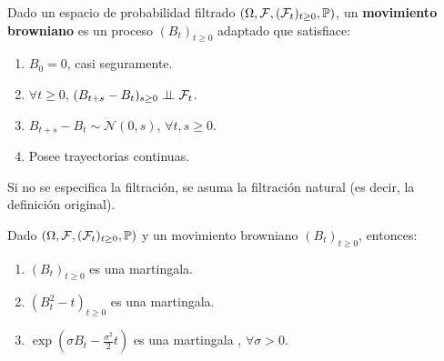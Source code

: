 \begin{definition}
Dado un espacio de probabilidad filtrado $(\Omega, \mathcal{F}, (\mathcal{F}_t)_{t \geq 0}, \P)$, 
un \textbf{movimiento browniano} es un proceso $(B_t)_{t\geq 0}$ adaptado que satisfiace:

\renewcommand{\labelenumi}{\roman{enumi})}
\begin{enumerate}
        \item   $B_0 = 0$, casi seguramente. 
        \item $\forall t \geq 0$, $(B_{t+s} - B_t)_{s \geq 0} \indep \mathcal{F}_t$. 
        \item $B_{t+s} - B_t \sim  \mathcal{N}(0,s)$, $\forall t,s \geq 0$. 
        \item Posee trayectorias continuas. 
\end{enumerate}
\end{definition}

Si no se especifica la filtración, se asuma la filtración natural (es decir, la definición original). 

\begin{proposition}
Dado $(\Omega, \mathcal{F},(\mathcal{F}_{t})_{t \geq 0}, \P)$ y un movimiento browniano 
$(B_{t})_{t \geq 0}$, entonces:

\begin{enumerate}
        \item \label{mba:1} $ (B_t)_{t \geq 0}$ es una martingala.
        \item \label{mba:2} $\left( B_t^2 - t \right)_{t \geq 0} $ es una martingala.
        \item \label{mba:3} $\exp\left( \sigma B_t - \frac{\sigma^2}{2}t \right) $ es una martingala
                , $\forall  \sigma >0$. 
\end{enumerate}
\end{proposition}

